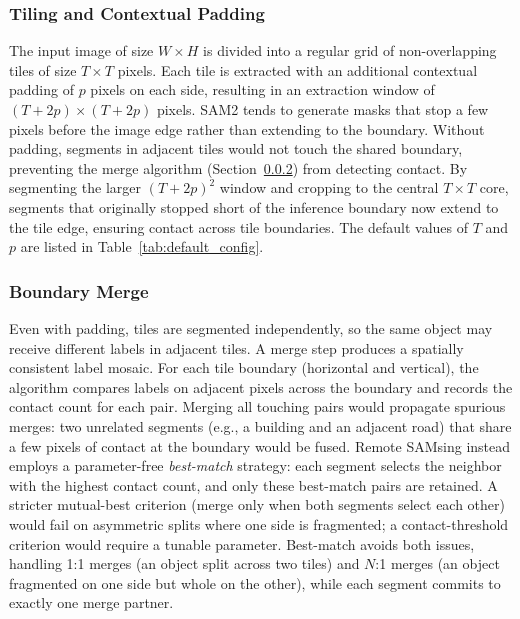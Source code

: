 \documentclass[review,11pt,authoryear]{elsarticle}
\begin{document}
\subsubsection{Tiling and Contextual Padding}
\label{sec:method_tiling}

The input image of size $W \times H$ is divided into a regular grid of non-overlapping tiles of size $T \times T$ pixels. Each tile is extracted with an additional contextual padding of $p$ pixels on each side, resulting in an extraction window of $(T + 2p) \times (T + 2p)$ pixels. SAM2 tends to generate masks that stop a few pixels before the image edge rather than extending to the boundary. Without padding, segments in adjacent tiles would not touch the shared boundary, preventing the merge algorithm (Section~\ref{sec:method_merge}) from detecting contact. By segmenting the larger $(T + 2p)^2$ window and cropping to the central $T \times T$ core, segments that originally stopped short of the inference boundary now extend to the tile edge, ensuring contact across tile boundaries. The default values of $T$ and $p$ are listed in Table~\ref{tab:default_config}.

\subsubsection{Boundary Merge}
\label{sec:method_merge}

Even with padding, tiles are segmented independently, so the same object may receive different labels in adjacent tiles. A merge step produces a spatially consistent label mosaic. For each tile boundary (horizontal and vertical), the algorithm compares labels on adjacent pixels across the boundary and records the contact count for each pair. Merging all touching pairs would propagate spurious merges: two unrelated segments (e.g., a building and an adjacent road) that share a few pixels of contact at the boundary would be fused. Remote SAMsing instead employs a parameter-free \textit{best-match} strategy: each segment selects the neighbor with the highest contact count, and only these best-match pairs are retained. A stricter mutual-best criterion (merge only when both segments select each other) would fail on asymmetric splits where one side is fragmented; a contact-threshold criterion would require a tunable parameter. Best-match avoids both issues, handling 1:1 merges (an object split across two tiles) and $N$:1 merges (an object fragmented on one side but whole on the other), while each segment commits to exactly one merge partner.
\end{document}
